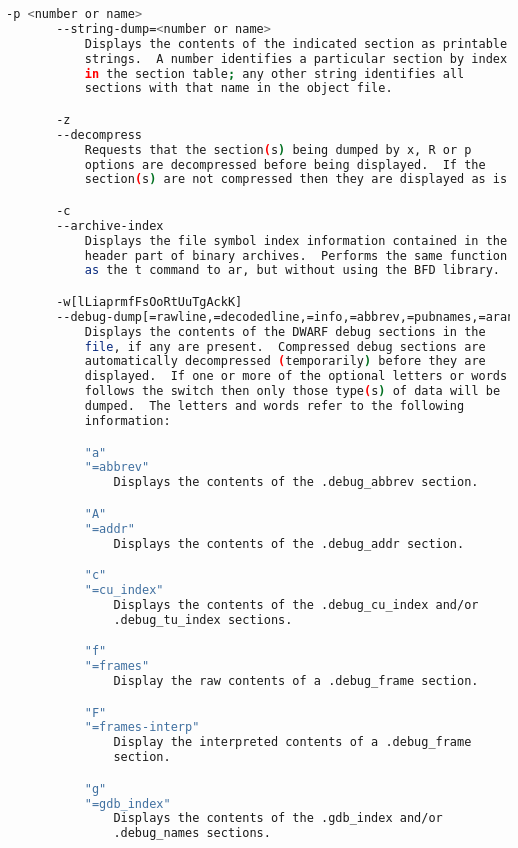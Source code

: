 {{\begin{lstlisting}[language=bash]
       -p <number or name>
       --string-dump=<number or name>
           Displays the contents of the indicated section as printable
           strings.  A number identifies a particular section by index
           in the section table; any other string identifies all
           sections with that name in the object file.

       -z
       --decompress
           Requests that the section(s) being dumped by x, R or p
           options are decompressed before being displayed.  If the
           section(s) are not compressed then they are displayed as is.

       -c
       --archive-index
           Displays the file symbol index information contained in the
           header part of binary archives.  Performs the same function
           as the t command to ar, but without using the BFD library.

       -w[lLiaprmfFsOoRtUuTgAckK]
       --debug-dump[=rawline,=decodedline,=info,=abbrev,=pubnames,=aranges,=macro,=frames,=frames-interp,=str,=str-offsets,=loc,=Ranges,=pubtypes,=trace_info,=trace_abbrev,=trace_aranges,=gdb_index,=addr,=cu_index,=links,=follow-links]
           Displays the contents of the DWARF debug sections in the
           file, if any are present.  Compressed debug sections are
           automatically decompressed (temporarily) before they are
           displayed.  If one or more of the optional letters or words
           follows the switch then only those type(s) of data will be
           dumped.  The letters and words refer to the following
           information:

           "a"
           "=abbrev"
               Displays the contents of the .debug_abbrev section.

           "A"
           "=addr"
               Displays the contents of the .debug_addr section.

           "c"
           "=cu_index"
               Displays the contents of the .debug_cu_index and/or
               .debug_tu_index sections.

           "f"
           "=frames"
               Display the raw contents of a .debug_frame section.

           "F"
           "=frames-interp"
               Display the interpreted contents of a .debug_frame
               section.

           "g"
           "=gdb_index"
               Displays the contents of the .gdb_index and/or
               .debug_names sections.


\end{lstlisting}}}
